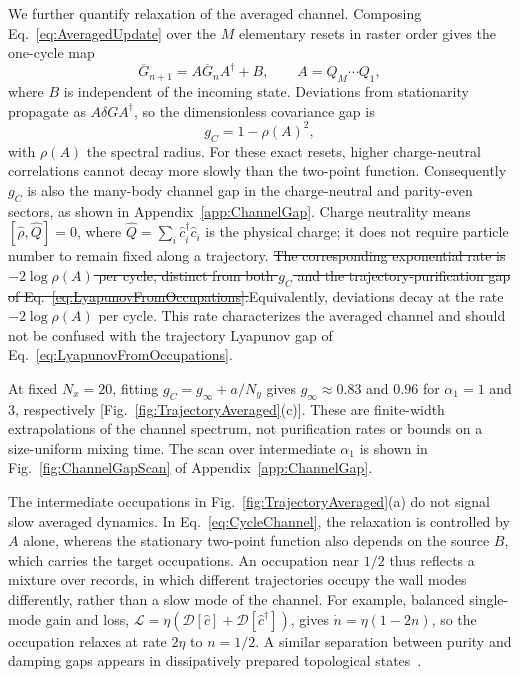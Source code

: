 \documentclass[aps,prb,10pt,twocolumn,superscriptaddress,longbibliography,floatfix]{revtex4-2}
\newcommand{\mc}[1]{\mathcal{#1}}
\newcommand{\newtext}[1]{{\color{blue}#1}}
\newcommand{\claudeadd}[1]{{\color{orange}#1}}
\newcommand{\claudedel}[1]{{\color{orange}\sout{#1}}}
\begin{document}
{\color{blue}
We further quantify relaxation of the averaged channel. Composing Eq.~\eqref{eq:AveragedUpdate} over the $M$ elementary resets in raster order gives the one-cycle map
\begin{equation}
 \overline G_{n+1}=A\overline G_nA^\dagger+B,\qquad A=Q_M\cdots Q_1,
 \label{eq:CycleChannel}
\end{equation}
where $B$ is independent of the incoming state. Deviations from stationarity propagate as $A\delta G A^\dagger$, so the dimensionless covariance gap is
\begin{equation}
 g_C=1-\rho(A)^2,
 \label{eq:ChannelGap}
\end{equation}
with $\rho(A)$ the spectral radius. For these exact resets, higher charge-neutral correlations cannot decay more slowly than the two-point function. Consequently $g_C$ is also the many-body channel gap in the charge-neutral and parity-even sectors, as shown in Appendix~\ref{app:ChannelGap}. Charge neutrality means $[\hat\rho,\hat Q]=0$, where $\hat Q=\sum_i\hat c_i^\dagger\hat c_i$ is the physical charge; it does not require particle number to remain fixed along a trajectory. \claudedel{The corresponding exponential rate is $-2\log\rho(A)$ per cycle, distinct from both $g_C$ and the trajectory-purification gap of Eq.~\eqref{eq:LyapunovFromOccupations}.}\claudeadd{Equivalently, deviations decay at the rate $-2\log\rho(A)$ per cycle. This rate characterizes the averaged channel and should not be confused with the trajectory Lyapunov gap of Eq.~\eqref{eq:LyapunovFromOccupations}.}

At fixed $N_x=20$, fitting $g_C=g_\infty+a/N_y$ gives $g_\infty\approx0.83$ and $0.96$ for $\alpha_1=1$ and $3$, respectively [Fig.~\ref{fig:TrajectoryAveraged}(c)]. These are finite-width extrapolations of the channel spectrum, not purification rates or bounds on a size-uniform mixing time. The scan over intermediate $\alpha_1$ is shown in Fig.~\ref{fig:ChannelGapScan} of Appendix~\ref{app:ChannelGap}.

\claudeadd{The intermediate occupations in Fig.~\ref{fig:TrajectoryAveraged}(a) do not signal slow averaged dynamics. In Eq.~\eqref{eq:CycleChannel}, the relaxation is controlled by $A$ alone, whereas the stationary two-point function also depends on the source $B$, which carries the target occupations. An occupation near $1/2$ thus reflects a mixture over records, in which different trajectories occupy the wall modes differently, rather than a slow mode of the channel. \newtext{For example, balanced single-mode gain and loss, $\mc L=\eta(\mc D[\hat c]+\mc D[\hat c^\dagger])$, gives $\dot n=\eta(1-2n)$, so the occupation relaxes at rate $2\eta$ to $n=1/2$.} A similar separation between purity and damping gaps appears in dissipatively prepared topological states~\cite{BardynEtAl2013}.}

}
\end{document}
